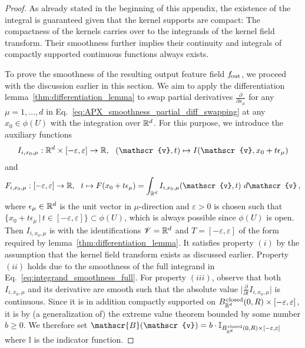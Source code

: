 \begin{proof}
    As already stated in the beginning of this appendix, the existence of the integral is guaranteed given that the kernel supports are compact:
    The compactness of the kernels carries over to the integrands of the kernel field transform.
    Their smoothness further implies their continuity and integrals of compactly supported continuous functions always exists.

    To prove the smoothness of the resulting output feature field $f_\textup{\:\!\!out}$, we proceed with the discussion earlier in this section.
    We aim to apply the differentiation lemma~\ref{thm:differentiation_lemma} to swap partial derivatives $\frac{\partial}{\partial x_\mu}$ for any $\mu=1,\dots,d$ in Eq.~\eqref{eq:APX_smoothness_partial_diff_swapping} at any $x_0 \in \phi(U)$ with the integration over $\mathbb{R}^d$.
    For this purpose, we introduce the auxiliary functions
    \begin{align}
        I_{i,x_0,\mu}: \R^d \times [-\varepsilon,\varepsilon] \to \R,\ \ (\mathscr{v},t) \mapsto I(\mathscr{v}, x_0 + t\epsilon_\mu)
    \end{align}
    and
    \begin{align}
        F_{i,x_0,\mu}: [-\varepsilon,\varepsilon] \to \R,\ \ t \mapsto F(x_0 + t\epsilon_\mu) = \int_{\R^d} I_{i,x_0,\mu}(\mathscr{v},t)\ d\mathscr{v} \,,
    \end{align}
    where $\epsilon_\mu \in \mathbb{R}^d$ is the unit vector in $\mu$-direction and
    $\varepsilon > 0$ is chosen such that $\big\{ x_0 + t\epsilon_\mu \,\big|\, t\in [-\varepsilon,\varepsilon] \big\} \subset \phi(U)$, which is always possible since $\phi(U)$ is open.
    Then $I_{i,x_0,\mu}$ is with the identifications $\mathscr{V}=\mathbb{R}^d$ and $T=[-\varepsilon,\varepsilon]$ of the form required by lemma~\ref{thm:differentiation_lemma}.
    It satisfies property $(i)$ by the assumption that the kernel field transform exists as discussed earlier.
    Property $(ii)$ holds due to the smoothness of the full integrand in Eq.~\eqref{eq:integrand_smoothness_full}.
    For property $(iii)$, observe that both $I_{i,x_0,\mu}$ and its derivative are smooth such that the absolute value $\big| \frac{\partial}{\partial t} I_{i,x_0,\mu} \big|$ is continuous.
    Since it is in addition compactly supported on $B_{\mathbb{R}^d}^{\mkern1.5mu\textup{closed}}(0,R) \times [-\varepsilon,\varepsilon]$, it is by (a generalization of) the extreme value theorem bounded by some number $b\geq0$.
    We therefore set $\mathscr{B}(\mathscr{v}) = b\cdot \mathbb{I}_{B_{\R^d}^{\mkern1.5mu\textup{closed}}(0,R) \times [-\varepsilon,\varepsilon]}$ where $\mathbb{I}$ is the indicator function.

\end{proof}
